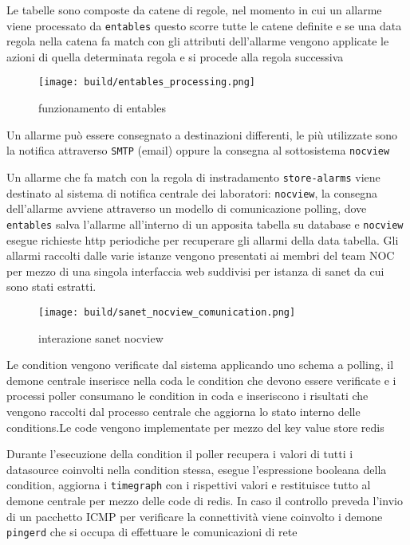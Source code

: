 Le tabelle sono composte da catene di regole, nel momento in cui un allarme viene processato da \verb|entables| questo scorre tutte le catene definite e se una data regola nella catena fa match con gli attributi dell'allarme vengono applicate le azioni di quella determinata regola e si procede alla regola successiva

\begin{figure}[H]
    \centering
    \texttt{[image: build/entables\_processing.png]}
    \caption{funzionamento di entables}
    \label{fig:enter-label}
\end{figure}

Un allarme può essere consegnato a destinazioni differenti, le più utilizzate sono la notifica attraverso \verb|SMTP| (email) oppure la consegna al sottosistema \verb|nocview|

Un allarme che fa match con la regola di instradamento \verb|store-alarms| viene destinato al sistema di notifica centrale dei laboratori: \verb|nocview|, la consegna dell'allarme avviene attraverso un modello di comunicazione polling, dove \verb|entables| salva l'allarme all'interno di un apposita tabella su database e \verb|nocview| esegue richieste http periodiche per recuperare gli allarmi della data tabella.
Gli allarmi raccolti dalle varie istanze vengono presentati ai membri del team NOC per mezzo di una singola interfaccia web suddivisi per istanza di sanet da cui sono stati estratti.

\begin{figure}[H]
    \centering
    \texttt{[image: build/sanet\_nocview\_comunication.png]}
    \caption{interazione sanet nocview}
    \label{fig:enter-label}
\end{figure}

Le condition vengono verificate dal sistema applicando uno schema a polling, il demone centrale inserisce nella coda le condition che devono essere verificate e i processi poller consumano le condition in coda e inseriscono i risultati che vengono raccolti dal processo centrale che aggiorna lo stato interno delle conditions.Le code vengono implementate per mezzo del key value store redis

Durante l'esecuzione della condition il poller recupera i valori di tutti i datasource coinvolti nella condition stessa, esegue l'espressione booleana della condition, aggiorna i \verb|timegraph| con i rispettivi valori e restituisce tutto al demone centrale per mezzo delle code di redis. In caso il controllo preveda l'invio di un pacchetto ICMP per verificare la connettività viene coinvolto i demone \verb|pingerd| che si occupa di effettuare le comunicazioni di rete

